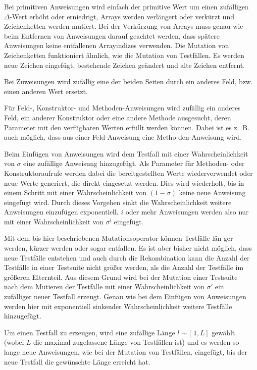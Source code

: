 \documentclass[a4paper,11pt]{article}
\begin{document}
Bei primitiven Anweisungen wird einfach der primitive Wert um einen zufälligen $\Delta$-Wert erhöht oder erniedrigt, Arrays werden verlängert oder verkürzt und Zeichenketten werden mutiert.
Bei der Verkürzung von Arrays muss genau wie beim Entfernen von Anweisungen darauf geachtet werden, dass spätere Anweisungen keine entfallenen Arrayindizes verwenden.
Die Mutation von Zeichenketten funktioniert ähnlich, wie die Mutation von Testfällen.
Es werden neue Zeichen eingefügt, bestehende Zeichen geändert und alte Zeichen entfernt.

Bei Zuweisungen wird zufällig eine der beiden Seiten durch ein anderes Feld, bzw. einen anderen Wert ersetzt.

Für Feld-, Konstruktor- und Methoden-Anweisungen wird zufällig ein anderes Feld, ein anderer Konstruktor oder eine andere Methode ausgesucht, deren Parameter mit den verfügbaren Werten erfüllt werden können.
Dabei ist es z.~B. auch möglich, dass aus einer Feld-Anweisung eine Metho-den-Anweisung wird.

Beim Einfügen von Anweisungen wird dem Testfall mit einer Wahrscheinlichkeit von $\sigma$ eine zufällige Anweisung hinzugefügt.
Als Parameter für Methoden- oder Konstruktoraufrufe werden dabei die bereitgestellten Werte wiederverwendet oder neue Werte generiert, die direkt eingesetzt werden.
Dies wird wiederholt, bis in einem Schritt mit einer Wahrscheinlichkeit von $(1 - \sigma)$ keine neue Anweisung eingefügt wird.
Durch dieses Vorgehen sinkt die Wahrscheinlichkeit weitere Anweisungen einzufügen exponentiell.
$i$ oder mehr Anweisungen werden also nur mit einer Wahrscheinlichkeit von $\sigma^i$ eingefügt.

Mit dem bis hier beschriebenen Mutationsoperator können Testfälle län-ger werden, kürzer werden oder sogar entfallen.
Es ist aber bisher nicht möglich, dass neue Testfälle entstehen und auch durch die Rekombination kann die Anzahl der Testfälle in einer Testsuite nicht größer werden, als die Anzahl der Testfälle im größeren Elternteil.
Aus diesem Grund wird bei der Mutation einer Testsuite nach dem Mutieren der Testfälle mit einer Wahrscheinlichkeit von $\sigma'$ ein zufälliger neuer Testfall erzeugt.
Genau wie bei dem Einfügen von Anweisungen werden hier mit exponentiell sinkender Wahrscheinlichkeit weitere Testfälle hinzugefügt.

Um einen Testfall zu erzeugen, wird eine zufällige Länge $l \sim [1, L]$ gewählt (wobei $L$ die maximal zugelassene Länge von Testfällen ist) und es werden so lange neue Anweisungen, wie bei der Mutation von Testfällen, eingefügt, bis der neue Testfall die gewünschte Länge erreicht hat.
\end{document}
